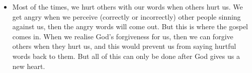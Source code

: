 \begin{itemize}
  \item{Most of the times, we hurt others with our words when others hurt us. We get angry when we perceive (correctly or incorrectly) other people sinning against us, then the angry words will come out. But this is where the gospel comes in. When we realise God’s forgiveness for us, then we can forgive others when they hurt us, and this would prevent us from saying hurtful words back to them. But all of this can only be done after God gives us a new heart.}
\end{itemize}